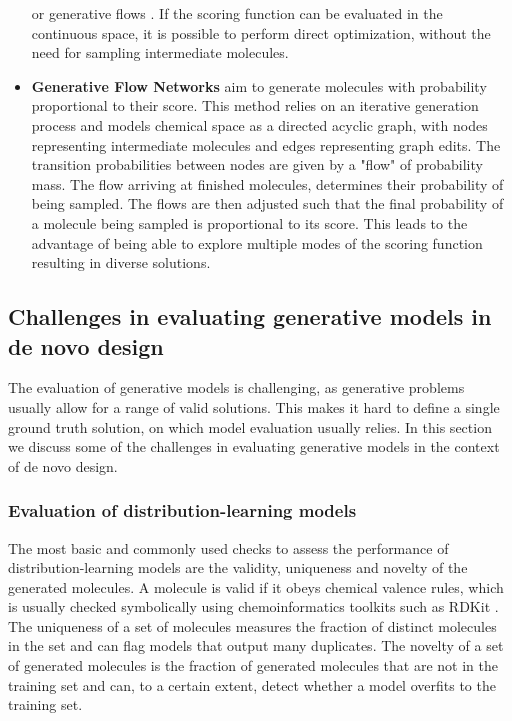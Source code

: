 \begin{itemize}
	      or generative flows \citep{madhawaGraphNVPInvertibleFlow2019}. If the scoring
	      function can be evaluated in the continuous space, it is possible to perform direct
	      optimization, without the need for sampling intermediate molecules.
	\item \textbf{Generative Flow Networks} \citep{bengioFlowNetworkBased2021} aim to generate
	      molecules with probability proportional to their score. This method relies on an
	      iterative generation process and models chemical space as a directed acyclic graph, with
	      nodes representing intermediate molecules and edges representing graph edits. The transition
	      probabilities between nodes are given by a "flow" of probability mass. The flow arriving
	      at finished molecules, determines their probability of being sampled. The flows are
	      then adjusted such that the final probability of a molecule being sampled is
	      proportional to its score. This leads to the advantage of being able to explore multiple
	      modes of the scoring function resulting in diverse solutions.
\end{itemize}

\subsection{Challenges in evaluating generative models in de novo design}

The evaluation of generative models is challenging, as generative problems usually allow for a
range of valid solutions. This makes it hard to define a single ground truth solution, on which model
evaluation usually relies. In this section we discuss some of the challenges in evaluating
generative models in the context of de novo design.

\subsubsection{Evaluation of distribution-learning models}
The most basic and commonly used checks to assess the performance of distribution-learning models are the validity,
uniqueness and novelty of the generated molecules. A molecule is valid if it obeys chemical valence rules, which is
usually checked symbolically using chemoinformatics toolkits such as RDKit
\citep{landrumRDKitOpensourceCheminformatics2006}. The uniqueness of a set of molecules measures the fraction of
distinct molecules in the set and can flag models that output many duplicates. The novelty of a set of generated
molecules is the fraction of generated molecules that are not in the training set and can, to a certain extent, detect
whether a model overfits to the training set.

